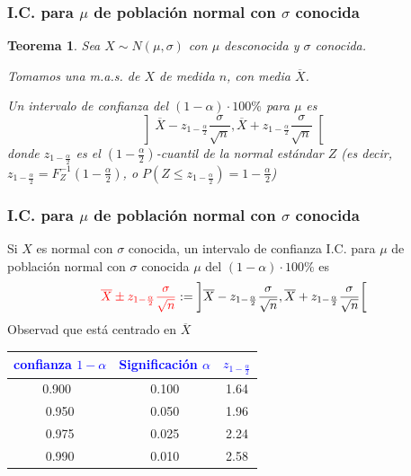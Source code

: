 \documentclass[12pt,t]{beamer}\usepackage[]{graphicx}\usepackage[]{color}
\newcommand{\red}[1]{\textcolor{red}{#1}}
\newcommand{\blue}[1]{\textcolor{blue}{#1}}
\renewcommand{\leq}{\leqslant}
\theoremstyle{plain}
\newtheorem{teorema}{Teorema}
\theoremstyle{definition}
\begin{document}
\begin{frame}
\frametitle{I.C. para $\mu$ de población normal con $\sigma$ conocida}
\vspace*{-3ex}

\begin{teorema}
Sea $X\sim N(\mu,\sigma)$ con $\mu$ desconocida y $\sigma$ conocida.
\medskip

Tomamos una m.a.s. de $X$ de medida $n$, con media $\overline{X}$.
\medskip

Un intervalo de confianza  del $(1-\alpha)\cdot 100\%$ para $\mu$  es
$$
\left]\overline{X} -z_{1-\frac{\alpha}{2}} \frac{\sigma}{\sqrt{n}}, \overline{X}+z_{1-\frac{\alpha}{2}}\frac{\sigma}{\sqrt{n}}
\right[
$$
donde $z_{1-\frac{\alpha}{2}}$ es el $(1-\frac{\alpha}{2})$-cuantil de la normal  estándar $Z$ (es decir, $z_{1-\frac{\alpha}{2}}=F_Z^{-1}(1-\frac{\alpha}{2})$, o $P(Z\leq z_{1-\frac{\alpha}{2}})=1-\frac{\alpha}{2}$)
\end{teorema}


\end{frame}


\begin{frame}
\frametitle{I.C. para $\mu$ de población normal con $\sigma$ conocida}

Si $X$ es normal con $\sigma$ conocida, un intervalo de confianza  I.C. para $\mu$ de población normal con $\sigma$ conocida $\mu$ del $(1-\alpha)\cdot 100\%$ es
$$
\red{\overline{X} \pm z_{1-\frac{\alpha}{2}} \frac{\sigma}{\sqrt{n}}}:=\left]\overline{X} -z_{1-\frac{\alpha}{2}} \frac{\sigma}{\sqrt{n}}, \overline{X}+z_{1-\frac{\alpha}{2}}\frac{\sigma}{\sqrt{n}}
\right[
$$
Observad que está centrado   en $\overline{X}$
\begin{center}
\begin{tabular}{c|c|c}
\blue{confianza  $1-\alpha$} & \blue{Significación $\alpha$} & \blue{$z_{1-\frac{\alpha}{2}}$}\\
 \hline
0.900\ & 0.100 &1.64 \\   
0.950 & 0.050 & 1.96\\
0.975 & 0.025 & 2.24 \\
0.990 & 0.010 & 2.58
\end{tabular}
\end{center}

\end{frame}
\end{document}
